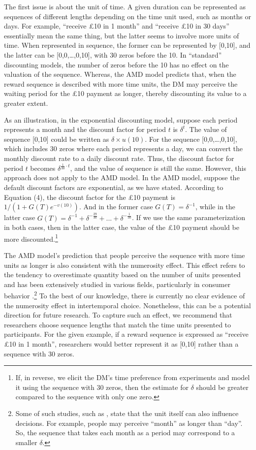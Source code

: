 \documentclass[
  12pt,
]{article}
\begin{document}
The first issue is about the unit of time. A given duration can be
represented as sequences of different lengths depending on the time unit
used, such as months or days. For example, ``receive £10 in 1 month''
and ``receive £10 in 30 days'' essentially mean the same thing, but the
latter seems to involve more units of time. When represented in
sequence, the former can be represented by {[}0,10{]}, and the latter
can be {[}0,0,\ldots,0,10{]}, with 30 zeros before the 10. In
``standard'' discounting models, the number of zeros before the 10 has
no effect on the valuation of the sequence. Whereas, the AMD model
predicts that, when the reward sequence is described with more time
units, the DM may perceive the waiting period for the £10 payment as
longer, thereby discounting its value to a greater extent.

As an illustration, in the exponential discounting model, suppose each
period represents a month and the discount factor for period \(t\) is
\(\delta^t\). The value of sequence {[}0,10{]} could be written as
\(\delta \times u(10)\). For the sequence {[}0,0,\ldots,0,10{]}, which
includes 30 zeros where each period represents a day, we can convert the
monthly discount rate to a daily discount rate. Thus, the discount
factor for period \(t\) becomes \(\delta^{\frac{1}{30}\cdot t}\), and
the value of sequence is still the same. However, this approach does not
apply to the AMD model. In the AMD model, suppose the default discount
factors are exponential, as we have stated. According to Equation (4),
the discount factor for the £10 payment is \(1/(1+G(T)e^{-v(10)})\). And
in the former case \(G(T)=\delta^{-1}\), while in the latter case
\(G(T)=\delta^{-1}+\delta^{-\frac{29}{30}}+...+\delta^{-\frac{1}{30}}\).
If we use the same parameterization in both cases, then in the latter
case, the value of the £10 payment should be more discounted.\footnote{If,
  in reverse, we elicit the DM's time preference from experiments and
  model it using the sequence with 30 zeros, then the estimate for
  \(\delta\) should be greater compared to the sequence with only one
  zero.}

The AMD model's prediction that people perceive the sequence with more
time units as longer is also consistent with the numerosity effect. This
effect refers to the tendency to overestimate quantity based on the
number of units presented \citep{pelham1994easy} and has been
extensively studied in various fields, particularly in consumer behavior
\citep{zhang2012and, monga2012years}.\footnote{Some of such studies,
  such as \citet{monga2012years}, state that the unit itself can also
  influence decisions. For example, people may perceive ``month'' as
  longer than ``day''. So, the sequence that takes each month as a
  period may correspond to a smaller \(\delta\).} To the best of our
knowledge, there is currently no clear evidence of the numerosity effect
in intertemporal choice. Nonetheless, this can be a potential direction
for future research. To capture such an effect, we recommend that
researchers choose sequence lengths that match the time units presented
to participants. For the given example, if a reward sequence is
expressed as ``receive £10 in 1 month'', researchers would better
represent it as {[}0,10{]} rather than a sequence with 30 zeros.
\end{document}
